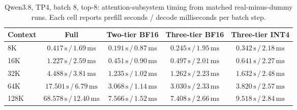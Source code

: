 \begin{table}[t]
\centering
\small
\caption{Qwen3.8, TP4, batch 8, top-8: attention-subsystem timing from matched real-minus-dummy runs. Each cell reports prefill seconds / decode milliseconds per batch step.}
\label{tab:prolong-qwen38-tp4-b8-attention-core}
\begin{tabular}{lcccc}
\toprule
Context & Full & Two-tier BF16 & Three-tier BF16 & Three-tier INT4 \\
\midrule
8K & \(0.417\,\mathrm{s}\,/\,1.69\,\mathrm{ms}\) & \(0.191\,\mathrm{s}\,/\,0.87\,\mathrm{ms}\) & \(0.245\,\mathrm{s}\,/\,1.95\,\mathrm{ms}\) & \(0.342\,\mathrm{s}\,/\,2.18\,\mathrm{ms}\) \\
16K & \(1.227\,\mathrm{s}\,/\,2.59\,\mathrm{ms}\) & \(0.451\,\mathrm{s}\,/\,0.90\,\mathrm{ms}\) & \(0.497\,\mathrm{s}\,/\,2.01\,\mathrm{ms}\) & \(0.641\,\mathrm{s}\,/\,2.27\,\mathrm{ms}\) \\
32K & \(4.488\,\mathrm{s}\,/\,3.81\,\mathrm{ms}\) & \(1.235\,\mathrm{s}\,/\,1.02\,\mathrm{ms}\) & \(1.262\,\mathrm{s}\,/\,2.23\,\mathrm{ms}\) & \(1.632\,\mathrm{s}\,/\,2.48\,\mathrm{ms}\) \\
64K & \(17.501\,\mathrm{s}\,/\,6.79\,\mathrm{ms}\) & \(3.068\,\mathrm{s}\,/\,1.14\,\mathrm{ms}\) & \(3.030\,\mathrm{s}\,/\,2.33\,\mathrm{ms}\) & \(3.820\,\mathrm{s}\,/\,2.57\,\mathrm{ms}\) \\
128K & \(68.578\,\mathrm{s}\,/\,12.40\,\mathrm{ms}\) & \(7.566\,\mathrm{s}\,/\,1.52\,\mathrm{ms}\) & \(7.408\,\mathrm{s}\,/\,2.66\,\mathrm{ms}\) & \(9.518\,\mathrm{s}\,/\,2.84\,\mathrm{ms}\) \\
\bottomrule
\end{tabular}
\end{table}

